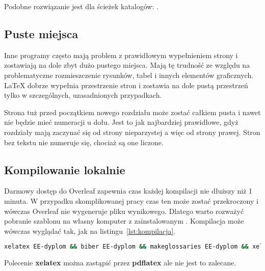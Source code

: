 Podobne rozwiązanie jest dla ścieżek katalogów: .

\subsection{Puste miejsca}
Inne programy często mają problem z prawidłowym wypełnieniem strony i zostawiają na dole zbyt dużo pustego miejsca. Mają tę trudność ze względu na problematyczne rozmieszczenie rysunków, tabel i innych elementów graficznych. \LaTeX{} dobrze wypełnia przestrzenie stron i zostawia na dole pustą przestrzeń tylko w szczególnych, uzasadnionych przypadkach.

Strona tuż przed początkiem nowego rozdziału może zostać całkiem pusta i nawet nie będzie mieć numeracji u dołu. Jest to jak najbardziej prawidłowe, gdyż rozdziały mają zaczynać się od strony nieparzystej a więc od strony prawej. Stron bez tekstu nie numeruje się, chociaż są one liczone.

\subsection{Kompilowanie lokalnie}
Darmowy dostęp do Overleaf zapewnia czas każdej kompilacji nie dłuższy niż 1 minuta. W przypadku skomplikowanej pracy czas ten może zostać przekroczony i wówczas Overleaf nie wygeneruje pliku wynikowego. Dlatego warto rozważyć pobranie szablonu na własny komputer z zainstalowanym . Kompilacja może wówczas wyglądać tak, jak na listingu~\ref{lst:kompilacja}.

\begin{lstlisting}[language=bash,
    caption={Kompilacja pracy dyplomowej lokalnie},
    label={lst:kompilacja}]
xelatex EE-dyplom && biber EE-dyplom && makeglossaries EE-dyplom && xelatex EE-dyplom && xelatex EE-dyplom
\end{lstlisting}

Polecenie \textbf{xelatex} można zastąpić przez \textbf{pdflatex} ale nie jest to zalecane.
